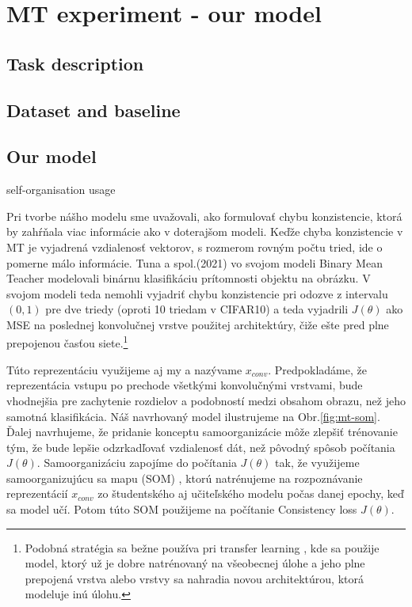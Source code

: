 \chapter{MT experiment - our model}

\label{chap:mt-exp} %

\section{Task description}

\section{Dataset and baseline}

\section{Our model}
self-organisation usage

Pri tvorbe nášho modelu sme uvažovali, ako formulovať chybu konzistencie, ktorá by zahŕňala viac informácie ako v doterajšom modeli. Keďže chyba konzistencie v MT je vyjadrená vzdialenosť vektorov, s rozmerom rovným počtu tried, ide o pomerne málo informácie. Tuna a spol.(2021) vo svojom modeli Binary Mean Teacher modelovali binárnu klasifikáciu prítomnosti objektu na obrázku. V svojom modeli teda nemohli vyjadriť chybu konzistencie pri odozve z intervalu $(0,1)$ pre dve triedy (oproti 10 triedam v CIFAR10) a teda vyjadrili $J(\theta)$ ako MSE na poslednej konvolučnej vrstve použitej architektúry, čiže ešte pred plne prepojenou časťou siete.\footnote{Podobná stratégia sa bežne používa pri transfer learning \cite{weiss2016}, kde sa použije model, ktorý už je dobre natrénovaný na všeobecnej úlohe a jeho plne prepojená vrstva alebo vrstvy sa nahradia novou architektúrou, ktorá modeluje inú úlohu.}

Túto reprezentáciu využijeme aj my a nazývame $x_{conv}$. Predpokladáme, že reprezentácia vstupu po prechode všetkými konvolučnými vrstvami, bude vhodnejšia pre zachytenie rozdielov a podobností medzi obsahom obrazu, než jeho samotná klasifikácia. Náš navrhovaný model ilustrujeme na Obr.\ref{fig:mt-som}.
Ďalej navrhujeme, že pridanie konceptu samoorganizácie môže zlepšiť trénovanie tým, že bude lepšie odzrkadľovať vzdialenosť dát, než pôvodný spôsob počítania $J(\theta)$. Samoorganizáciu zapojíme do počítania $J(\theta)$ tak, že využijeme samoorganizujúcu sa mapu (SOM) \cite{kohonen1990}, ktorú natrénujeme na rozpoznávanie reprezentácií $x_{conv}$ zo študentského aj učiteľského modelu počas danej epochy, keď sa model učí. Potom túto SOM použijeme na počítanie Consistency loss $J(\theta)$.

